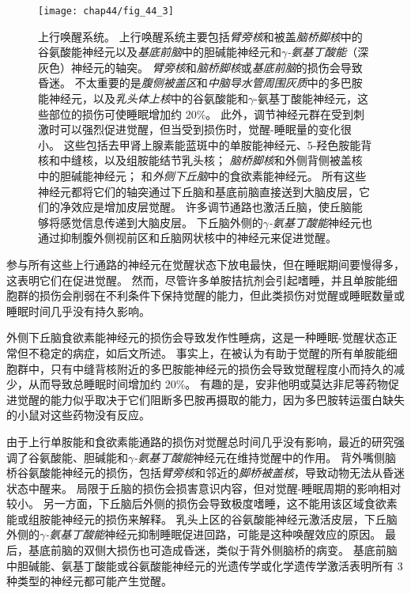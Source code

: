 \begin{figure}[htbp]
	\centering
	\texttt{[image: chap44/fig\_44\_3]}
	\caption{上行唤醒系统。
		上行唤醒系统主要包括\textit{臂旁核}和被盖\textit{脑桥脚核}中的谷氨酸能神经元以及\textit{基底前脑}中的胆碱能神经元和\textit{$\gamma$-氨基丁酸能}（深灰色）神经元的轴突。
		\textit{臂旁核}和\textit{脑桥脚核}或\textit{基底前脑}的损伤会导致昏迷。
		不太重要的是\textit{腹侧被盖区}和\textit{中脑导水管周围灰质}中的多巴胺能神经元，以及\textit{乳头体上核}中的谷氨酸能和$\gamma$-氨基丁酸能神经元，这些部位的损伤可使睡眠增加约 20\%。
		此外，调节神经元群在受到刺激时可以强烈促进觉醒，但当受到损伤时，觉醒-睡眠量的变化很小。
		这些包括去甲肾上腺素能蓝斑中的单胺能神经元、5-羟色胺能背核和中缝核，以及组胺能结节乳头核；
		\textit{脑桥脚核}和外侧背侧被盖核中的胆碱能神经元；
		和\textit{外侧下丘脑}中的食欲素能神经元。
		所有这些神经元都将它们的轴突通过下丘脑和基底前脑直接送到大脑皮层，它们的净效应是增加皮层觉醒。
		许多调节通路也激活丘脑，使丘脑能够将感觉信息传递到大脑皮层。
		下丘脑外侧的\textit{$\gamma$-氨基丁酸能}神经元也通过抑制腹外侧视前区和丘脑网状核中的神经元来促进觉醒。}
	\label{fig:44_3}
\end{figure}


参与所有这些上行通路的神经元在觉醒状态下放电最快，但在睡眠期间要慢得多，这表明它们在促进觉醒。
然而，尽管许多单胺拮抗剂会引起嗜睡，并且单胺能细胞群的损伤会削弱在不利条件下保持觉醒的能力，但此类损伤对觉醒或睡眠数量或睡眠时间几乎没有持久影响。


外侧下丘脑食欲素能神经元的损伤会导致发作性睡病，这是一种睡眠-觉醒状态正常但不稳定的病症，如后文所述。
事实上，在被认为有助于觉醒的所有单胺能细胞群中，只有中缝背核附近的多巴胺能神经元的损伤会导致觉醒程度小而持久的减少，从而导致总睡眠时间增加约 20\%。
有趣的是，安非他明或莫达非尼等药物促进觉醒的能力似乎取决于它们阻断多巴胺再摄取的能力，因为多巴胺转运蛋白缺失的小鼠对这些药物没有反应。


由于上行单胺能和食欲素能通路的损伤对觉醒总时间几乎没有影响，最近的研究强调了谷氨酸能、胆碱能和\textit{$\gamma$-氨基丁酸能}神经元在维持觉醒中的作用。
背外嘴侧脑桥谷氨酸能神经元的损伤，包括\textit{臂旁核}和邻近的\textit{脚桥被盖核}，导致动物无法从昏迷状态中醒来。
局限于丘脑的损伤会损害意识内容，但对觉醒-睡眠周期的影响相对较小。
另一方面，下丘脑后外侧的损伤会导致极度嗜睡，这不能用该区域食欲素能或组胺能神经元的损伤来解释。
乳头上区的谷氨酸能神经元激活皮层，下丘脑外侧的\textit{$\gamma$-氨基丁酸能}神经元抑制睡眠促进回路，可能是这种唤醒效应的原因。
最后，基底前脑的双侧大损伤也可造成昏迷，类似于背外侧脑桥的病变。
基底前脑中胆碱能、氨基丁酸能或谷氨酸能神经元的光遗传学或化学遗传学激活表明所有 3 种类型的神经元都可能产生觉醒。


